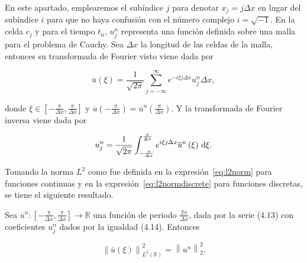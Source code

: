 En este apartado, emplearemos el subíndice $j$ para denotar
$x_{j}=j\Delta x$ en lugar del subíndice $i$ para que no haya
confusión con el número complejo $i=\sqrt{-1}$.
En la celda $c_{j}$ y para el tiempo $t_{n}$, $u^{n}_{j}$ representa
una función definida sobre una malla para el problema de Cauchy.
Sea $\Delta x$ la longitud de las celdas de la malla,
entonces su transformada de Fourier visto viene dada por

\begin{equation*}
  \overline{u}
  \left(\xi\right)=
  \frac{1}{\sqrt{2\pi}}
  \sum_{j=-\infty}^{\infty}
  e^{-i\xi j\Delta x}
  u^{n}_{j}\Delta x,
\end{equation*}

donde
\begin{math}
  \xi\in
  \left[
    -\frac{\pi}{\Delta x},
    \frac{\pi}{\Delta x}
    \right]
\end{math}
y
\begin{math}
  \overline{u}
  \left(
  -\frac{\pi}{\Delta x}
  \right)=
  \overline{u}^{n}
  \left(
  \frac{\pi}{\Delta x}
  \right)
\end{math}.
Y la transformada de Fourier inversa viene dada por

\begin{equation*}
  u^{n}_{j}=
  \frac{1}{\sqrt{2\pi}}
  \int_{-\frac{\pi}{\Delta x}}^{\frac{\pi}{\Delta x}}
  e^{i\xi j\Delta x}
  \overline{u}^{n}
  \left(\xi\right)
  \dl\xi.
\end{equation*}

Tomando la norma $L^{2}$ como fue definida en la
expresión~\eqref{eq:l2norm} para funciones continuas y en la
expresión~\eqref{eq:l2normdiscrete} para funciones discretas, se
tiene el siguiente resultado.

\begin{theorem}
  Sea
  \begin{math}
    \overline{u}^{n}\colon
    \left[
      -\frac{\pi}{\Delta x},
      \frac{\pi}{\Delta x}
      \right]\to
    \mathbb{R}
  \end{math}
  una función de periodo $\frac{2\pi}{\Delta x}$, dada por la serie (4.13)
  con coeficientes $u^{n}_{j}$ dados por la igualdad (4.14).
  Entonces

  \begin{equation*}
    {\left\|\overline{u}\left(\xi\right)\right\|}^{2}_{L^{2}\left(\mathbb{R}\right)}=
    {\left\|u^{n}\right\|}^{2}_{2}.
  \end{equation*}
\end{theorem}

